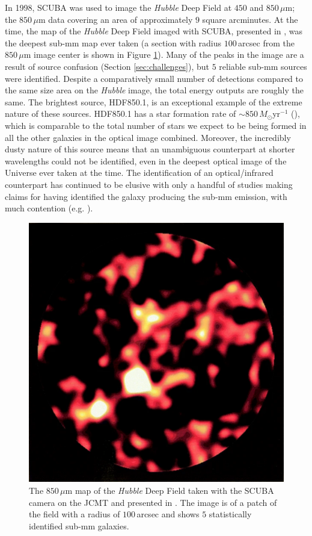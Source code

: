 In 1998, SCUBA was used to image the \textit{Hubble} Deep Field at $450$ and $850\,\mu$m; the $850\,\mu$m data covering an area of approximately $9$ square arcminutes. At the time, the map of the \textit{Hubble} Deep Field imaged with SCUBA, presented in \citealt{Hughes_1998}, was the deepest sub-mm map ever taken (a section with radius $100\,$arcsec from the $850\,\mu$m image center is shown in Figure \ref{fig:hubble_deep_field_scuba}). Many of the peaks in the image are a result of source confusion (Section \ref{sec:challenges}), but $5$ reliable sub-mm sources were identified. Despite a comparatively small number of detections compared to the same size area on the \textit{Hubble} image, the total energy outputs are roughly the same. The brightest source, HDF850.1, is an exceptional example of the extreme nature of these sources. HDF850.1 has a star formation rate of $\sim 850\,M_\odot$yr$^{-1}$ (\citealt{Walter_2012}), which is comparable to the total number of stars we expect to be being formed in all the other galaxies in the optical image combined. Moreover, the incredibly dusty nature of this source means that an unambiguous counterpart at shorter wavelengths could not be identified, even in the deepest optical image of the Universe ever taken at the time. The identification of an optical/infrared counterpart has continued to be elusive with only a handful of studies making claims for having identified the galaxy producing the sub-mm emission, with much contention (e.g. \citealt{Dunlop_2004, Serjeant_2014, Sun_2023}).

\begin{figure}
    \centering
	\includegraphics[width=0.8\columnwidth]{Figures/hubble_deep_field_scuba.pdf}
	\caption[Hubble Deep Field as captured by SCUBA on the JCMT]{The $850\,\mu$m map of the \textit{Hubble} Deep Field taken with the SCUBA camera on the JCMT and presented in \citealt{Hughes_1998}. The image is of a patch of the field with a radius of $100\,$arcsec and shows $5$ statistically identified sub-mm galaxies.}
	\label{fig:hubble_deep_field_scuba}
\end{figure}

